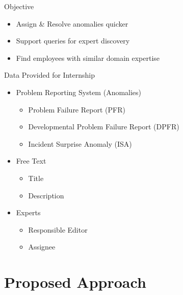 \documentclass[10pt]{beamer}
\begin{document}
\begin{frame}{Objective}
  \begin{itemize}
  \item Assign \& Resolve anomalies quicker
  \item Support queries for expert discovery
  \item Find employees with similar domain expertise
  \end{itemize}
\end{frame}



\begin{frame}{Data Provided for Internship}
  \begin{itemize}
  \item Problem Reporting System (Anomalies)
    \begin{itemize}
    \item Problem Failure Report (PFR)
    \item Developmental Problem Failure Report (DPFR)
    \item Incident Surprise Anomaly (ISA)
    \end{itemize}
  \end{itemize}

  \hrulefill
  \begin{itemize}
  \item Free Text
    \begin{itemize}
    \item Title
    \item Description
    \end{itemize}
  \item Experts
    \begin{itemize}
    \item Responsible Editor
    \item Assignee
    \end{itemize}
  \end{itemize}
\end{frame}



\section{Proposed Approach}
\end{document}
